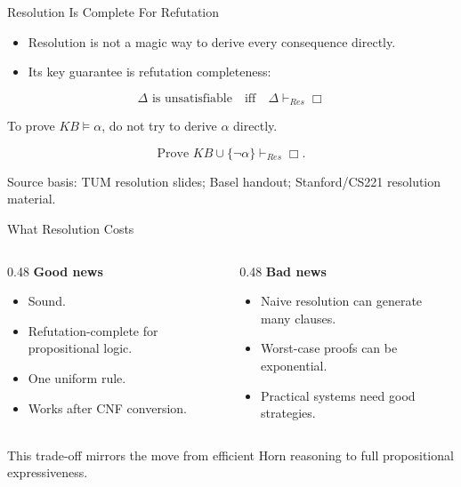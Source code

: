 \documentclass[aspectratio=169,11pt]{beamer}
\newcommand{\minihead}[1]{\textbf{\color{unswblue}#1}}
\newcommand{\source}[1]{\vfill{\scriptsize\color{darkgrey}Source basis: #1}}
\begin{document}
\begin{frame}{Resolution Is Complete For Refutation}
  \begin{itemize}
    \item Resolution is not a magic way to derive every consequence directly.
    \item Its key guarantee is refutation completeness:
  \end{itemize}

  \[
    \Delta \text{ is unsatisfiable}
    \quad \text{iff} \quad
    \Delta \vdash_{Res} \Box
  \]

  \vspace{0.8em}
  To prove $KB \models \alpha$, do not try to derive $\alpha$ directly.

  \[
    \text{Prove } KB \cup \{\neg \alpha\} \vdash_{Res} \Box.
  \]

  \source{TUM resolution slides; Basel handout; Stanford/CS221 resolution material.}
\end{frame}

\begin{frame}{What Resolution Costs}
  \begin{columns}[T,onlytextwidth]
    \begin{column}{0.48\textwidth}
      \minihead{Good news}
      \begin{itemize}
        \item Sound.
        \item Refutation-complete for propositional logic.
        \item One uniform rule.
        \item Works after CNF conversion.
      \end{itemize}
    \end{column}
    \begin{column}{0.48\textwidth}
      \minihead{Bad news}
      \begin{itemize}
        \item Naive resolution can generate many clauses.
        \item Worst-case proofs can be exponential.
        \item Practical systems need good strategies.
      \end{itemize}
    \end{column}
  \end{columns}

  \vspace{0.6em}
  This trade-off mirrors the move from efficient Horn reasoning to full propositional expressiveness.
\end{frame}
\end{document}

